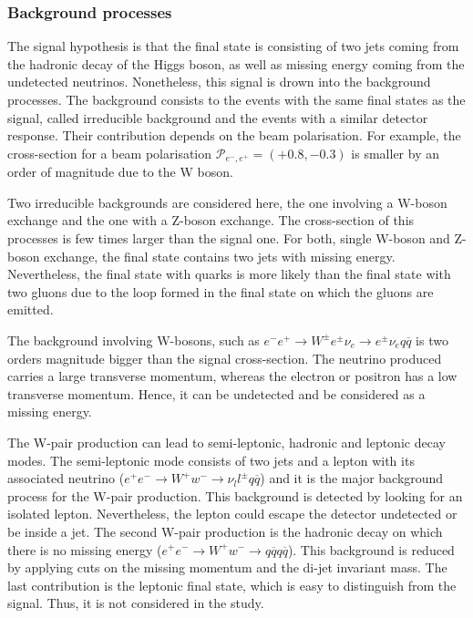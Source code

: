   \subsubsection{Background processes}

    The signal hypothesis is that the final state is consisting of two jets coming from the hadronic decay of the Higgs boson, as well as missing energy coming from the undetected neutrinos.
    Nonetheless, this signal is drown into the background processes.
    The background consists to the events with the same final states as the signal, called irreducible background and the events with a similar detector response.
    Their contribution depends on the beam polarisation.
    For example, the cross-section for a beam polarisation $\mathcal{P}_{e^-,e^+} = (+0.8,-0.3)$ is smaller by an order of magnitude due to the W boson.

    Two irreducible backgrounds are considered here, the one involving a W-boson exchange and the one with a Z-boson exchange.
    The cross-section of this processes is few times larger than the signal one.
    For both, single W-boson and Z-boson exchange, the final state contains two jets with missing energy.
    Nevertheless, the final state with quarks is more likely than the final state with two gluons due to the loop formed in the final state on which the gluons are emitted.


    The background involving W-bosons, such as $e^{-}e^{+} \rightarrow W^{\pm}e^{\pm}\nu_{e} \rightarrow e^{\pm}\nu_{e}q\overline{q}$ is two orders magnitude bigger than the signal cross-section.
    The neutrino produced carries a large transverse momentum, whereas the electron or positron has a low transverse momentum.
    Hence, it can be undetected and be considered as a missing energy.
    
    The W-pair production can lead to semi-leptonic, hadronic and leptonic decay modes.
    The semi-leptonic mode consists of two jets and a lepton with its associated neutrino ($e^{+}e^{-} \rightarrow W^+w^- \rightarrow \nu_{l}l^{\pm}q\overline{q}$) and it is the major background process for the W-pair production.
    This background is detected by looking for an isolated lepton.
    Nevertheless, the lepton could escape the detector undetected or be inside a jet.
    The second W-pair production is the hadronic decay on which there is no missing energy ($e^{+}e^{-} \rightarrow W^+w^- \rightarrow q\overline{q} q\overline{q}$).
    This background is reduced by applying cuts on the missing momentum and the di-jet invariant mass.
    The last contribution is the leptonic final state, which is easy to distinguish from the signal.
    Thus, it is not considered in the study. 

